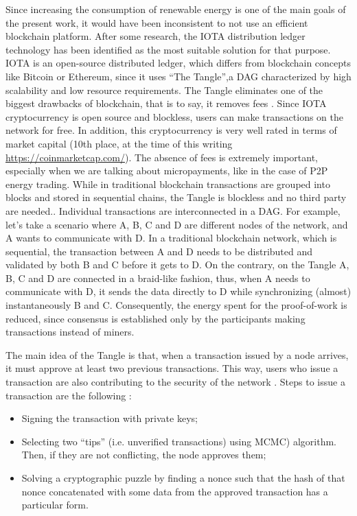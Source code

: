 Since increasing the consumption of renewable energy is one of the main goals of the present work, it would have been inconsistent to not use an efficient blockchain platform. After some research, the IOTA distribution ledger technology has been identified as the most suitable solution for that purpose. IOTA is an open-source distributed ledger, which differs from blockchain concepts like Bitcoin or Ethereum, since it uses “The Tangle”,a \ac{DAG} characterized by high scalability and low resource requirements. The Tangle eliminates one of the biggest drawbacks of blockchain, that is to say, it removes fees \cite{WhatisIOTA}. Since IOTA cryptocurrency is open source and blockless, users can make transactions on the network for free. In addition, this cryptocurrency is very well rated in terms of market capital (10th place, at the time of this writing \url{https://coinmarketcap.com/}).  The absence of fees is extremely important, especially when we are talking about micropayments, like in the case of \ac{P2P} energy trading. While in traditional blockchain transactions are grouped into blocks and stored in sequential chains, the Tangle is blockless and no third party are needed.. Individual transactions are interconnected in a \ac{DAG}. For example, let’s take a scenario where A, B, C and D are different nodes of the network, and A wants to communicate with D. In a traditional blockchain network, which is sequential, the transaction between A and D needs to be distributed and validated by both B and C before it gets to D. On the contrary, on the Tangle A, B, C and D are connected in a braid-like fashion, thus, when A needs to communicate with D, it sends the data directly to D while synchronizing (almost) instantaneously B and C. Consequently, the energy spent for the proof-of-work is reduced, since consensus is established only by the participants making transactions instead of miners.


The main idea of the Tangle is that, when a transaction issued by a node arrives, it must approve at least two previous transactions. This way, users who issue a transaction are also contributing to the security of the network \cite{TheTangle}. Steps to issue a transaction are the following \cite{TheTangle}:

\begin{itemize}
    \item Signing the transaction with private keys;
    \item Selecting two “tips” (i.e. unverified transactions) using \ac{MCMC}) algorithm. Then, if they are not conflicting, the node approves them;
    \item Solving a cryptographic puzzle by finding a nonce such that the hash of that nonce concatenated with some data from the approved transaction has a particular form.
\end{itemize}

